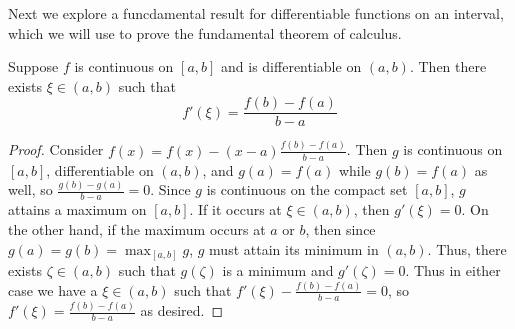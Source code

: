 Next we explore a funcdamental result for differentiable functions on an interval, which we will use to prove the fundamental theorem of calculus.

\begin{theorem}
    Suppose $f$ is continuous on $[a,b]$ and is differentiable on $(a,b)$. Then there exists $\xi \in (a,b)$ such that $$f'(\xi) = \frac{f(b) - f(a)}{b-a}$$
\end{theorem}
\begin{proof}
    Consider $f(x) = f(x) - (x-a)\frac{f(b) - f(a)}{b-a}$. Then $g$ is continuous on $[a,b]$, differentiable on $(a,b)$, and $g(a) = f(a)$ while $g(b) = f(a)$ as well, so $\frac{g(b) - g(a)}{b-a} = 0$. Since $g$ is continuous on the compact set $[a,b]$, $g$ attains a maximum on $[a,b]$. If it occurs at $\xi \in (a,b)$, then $g'(\xi) = 0$. On the other hand, if the maximum occurs at $a$ or $b$, then since $g(a) = g(b) = \max_{[a,b]}g$, $g$ must attain its minimum in $(a,b)$. Thus, there exists $\zeta \in (a,b)$ such that $g(\zeta)$ is a minimum and $g'(\zeta) = 0$. Thus in either case we have a $\xi \in (a,b)$ such that $f'(\xi) - \frac{f(b)-f(a)}{b-a} = 0$, so $f'(\xi) = \frac{f(b) - f(a)}{b-a}$ as desired.
\end{proof}


